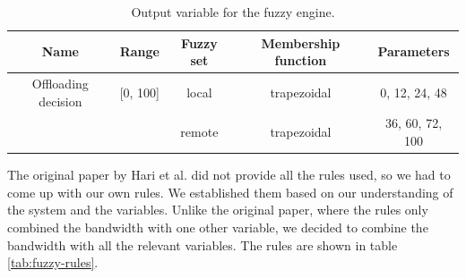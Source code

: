\begin{table}[H]
	\centering
	\begin{tabular}{|c|c|c|c|c|}
		\hline
		Name                & Range    & Fuzzy set & Membership function & Parameters      \\
		\hline
		Offloading decision & [0, 100] & local     & trapezoidal         & 0, 12, 24, 48   \\
		                    &          & remote    & trapezoidal         & 36, 60, 72, 100 \\
		\hline
	\end{tabular}
	\caption{Output variable for the fuzzy engine.}
	\label{tab:fuzzy-output}
\end{table}

The original paper by Hari et al. did not provide all the rules used, so we had to come up with our own rules. We
established them based on our understanding of the system and the variables. Unlike the original paper, where the
rules only combined the bandwidth with one other variable, we decided to combine the bandwidth with all the relevant
variables. The rules are shown in table \ref{tab:fuzzy-rules}.

